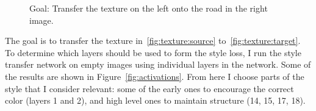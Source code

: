 \documentclass[10pt,twocolumn,letterpaper]{article}
\begin{document}
\begin{figure}
	\caption{Goal: Transfer the texture on the left onto the road in the right image.}
\end{figure}

The goal is to transfer the texture in~\ref{fig:texture:source} to~\ref{fig:texture:target}. To determine which layers should be used to form the style loss, I run the style transfer network on empty images using individual layers in the network. Some of the results are shown in Figure~\ref{fig:activations}. From here I choose parts of the style that I consider relevant: some of the early ones to encourage the correct color (layers 1 and 2), and high level ones to maintain structure (14, 15, 17, 18).
\end{document}
